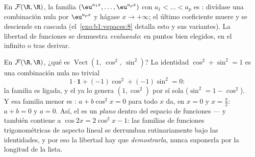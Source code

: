 \begin{example}\label{ex:b1:vspaces:functionfree}
En $\mathcal{F}(\R,\R)$, la familia
$(\eu^{a_1 x}, \dots, \eu^{a_p x})$ con $a_1 < \dots < a_p$ es
: divídase una combinación nula por $\eu^{a_p x}$ y hágase
$x \to +\infty$; el último coeficiente muere y se desciende en
cascada (el~\cref{exo:b1:vspaces:8} detalla esto y sus variantes). La
libertad de funciones se demuestra \emph{evaluando}: en puntos bien
elegidos, en el infinito o tras derivar.
\end{example}

\begin{example}
\label{ex:b1:vspaces:hiddenrelation}
En $\mathcal{F}(\R, \R)$, ¿qué es
$\operatorname{Vect}(1,\ \cos^2,\ \sin^2)$? La identidad
$\cos^2 + \sin^2 = 1$ es una combinación nula no trivial
\[
1\cdot\mathbf{1} + (-1)\cos^2 + (-1)\sin^2 = 0 :
\]
la familia es ligada, y el  ya lo genera
$(1, \cos^2)$ por sí sola ($\sin^2 = 1 - \cos^2$). Y esa familia
menor es : $a + b\cos^2 x = 0$ para todo $x$ da, en $x = 0$ y
$x = \frac\pi2$: $a + b = 0$ y $a = 0$. Así, el 
es un \emph{plano} dentro del espacio de funciones --- y también
contiene a $\cos 2x = 2\cos^2 x - 1$: las familias de funciones
trigonométricas de aspecto lineal se derrumban rutinariamente bajo
las identidades, y por eso la libertad hay que \emph{demostrarla},
nunca suponerla por la longitud de la lista.
\end{example}

